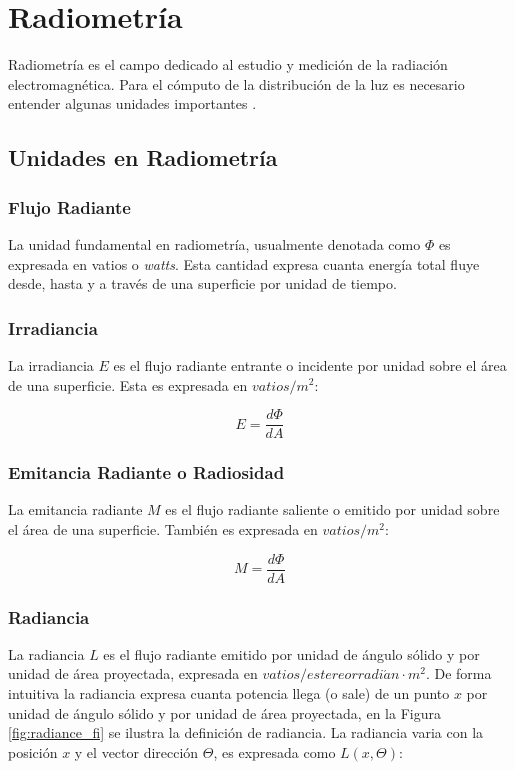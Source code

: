 \section{Radiometría}
Radiometría es el campo dedicado al estudio y medición de la radiación electromagnética. Para el cómputo de la distribución de la luz es necesario entender algunas unidades importantes \cite{advanced_gi2006}.

\subsection{Unidades en Radiometría}

\subsubsection{Flujo Radiante}
La unidad fundamental en radiometría, usualmente denotada como $\Phi$ es expresada en vatios o \emph{watts}. Esta cantidad expresa cuanta energía total fluye desde, hasta y a través de una superficie por unidad de tiempo.
\subsubsection{Irradiancia}
\label{subsubsec:irradiance}
La irradiancia $E$ es el flujo radiante entrante o incidente por unidad sobre el área de una superficie. Esta es expresada en $vatios/m^2$:

\begin{equation}
    E = \frac{d\Phi}{dA}
	\label{eq:irradiance_eq}
\end{equation}

\subsubsection{Emitancia Radiante o Radiosidad}
La emitancia radiante $M$ es el flujo radiante saliente o emitido por unidad sobre el área de una superficie. También es expresada en $vatios/m^2$:

\begin{equation}
    M = \frac{d\Phi}{dA}
	\label{eq:radiosity_eq}
\end{equation}

\subsubsection{Radiancia}
La radiancia $L$ es el flujo radiante emitido por unidad de ángulo sólido y por unidad de área proyectada, expresada en $vatios/estereorradi\acute{a}n\cdot m^2$. De forma intuitiva la radiancia expresa cuanta potencia llega (o sale) de un punto $x$ por unidad de ángulo sólido y por unidad de área proyectada, en la Figura \ref{fig:radiance_fi} se ilustra la definición de radiancia. La radiancia varia con la posición $x$ y el vector dirección $\Theta$, es expresada como $L(x,\Theta)$:

